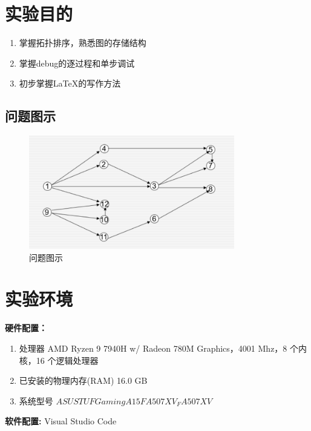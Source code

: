 \documentclass[a4,10pt]{article}
\begin{document}
\renewcommand{\contentsname}{\centering 目录}  
\begin{spacing}{2}
\tableofcontents
\end{spacing}

\newpage
\section{实验目的}
\begin{enumerate}
\item{掌握拓扑排序，熟悉图的存储结构}
\item{掌握debug的逐过程和单步调试}
\item{初步掌握\LaTeX{}的写作方法}
\end{enumerate}
\subsection{问题图示}
\begin{figure}[h]
    \centering
    \includegraphics[width=0.8\textwidth]{quest.png}
    \caption{问题图示}
    \label{fig:question}
\end{figure}

\section{实验环境}
\textbf{硬件配置：}
\begin{enumerate}
    \item 处理器	AMD Ryzen 9 7940H w/ Radeon 780M Graphics，4001 Mhz，8 个内核，16 个逻辑处理器
    \item  已安装的物理内存(RAM)	16.0 GB
    \item 系统型号 $ASUS TUF Gaming A15FA507XV_FA507XV$
    
  
\end{enumerate}

\hspace{0.1em}\textbf{软件配置:} Visual Studio Code 
\end{document}
